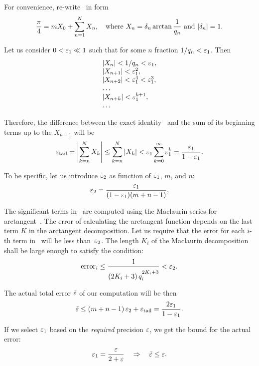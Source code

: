 \documentclass[draft, 10pt]{article} %
\begin{document}
For convenience, re-write~ in form
%
\begin{equation}\mlabel{machin-x}
\dfrac{\pi}{4} = m X_0 + \ds\sum_{n=1}^N X_n, \quad
    \hbox{where $X_n = \delta_n \arctan\dfrac{1}{q_n}$ and $\absolute{\delta_n} = 1$.}
\end{equation}

Let us consider $0 < \varepsilon_1 \ll 1$ such that for some $n$ fraction $1/q_n < \varepsilon_1$.
Then
$$
\begin{array}{l}
\left| X_n \right| < 1/q_n < \varepsilon_1, \\
\left| X_{n+1} \right| < \varepsilon_1^2, \\
\left| X_{n+2} \right| < \varepsilon_1^4 < \varepsilon_1^3, \\
\dots \\
\left| X_{n+k} \right| < \varepsilon_1^{k+1}, \\
\dots \\
\end{array}
$$

Therefore, the difference between the exact identity~ and the sum
of its beginning terms up to the $X_{n-1}$ will be
$$
\varepsilon_{\mathrm{tail}} = \left| \displaystyle\sum_{k=n}^N X_k \right| \le \displaystyle\sum_{k=n}^N \left| X_k \right|
    < \varepsilon_1 \displaystyle\sum_{k=0}^\infty \varepsilon_1^k = \displaystyle\frac{\varepsilon_1}{1-\varepsilon_1}.
$$

To be specific, let us introduce $\varepsilon_2$ as function of $\varepsilon_1$, $m$, and $n$:
$$
\varepsilon_2 = \displaystyle\frac{\varepsilon_1}{(1-\varepsilon_1)(m+n-1)},
$$

The significant terms in~ are computed using the Maclaurin series for
arctangent~. The error of calculating the arctangent function
depends on the last term $K$ in the arctangent decomposition.
Let us require that the error for each $i$-th term in~
will be less than~$\varepsilon_2$. The length $K_i$ of the Maclaurin decomposition
shall be large enough to satisfy the condition:
$$
\mathrm{error}_i \le \displaystyle\frac{1}{(2K_i+3) \, q_i^{2K_i+3\strut}} < \varepsilon_2.
$$

The actual total error $\tilde{\varepsilon}$ of our computation will be then
$$
\tilde{\varepsilon} \le (m+n-1) \, \varepsilon_2 + \varepsilon_{\mathrm{tail}} = \displaystyle\frac{2 \varepsilon_1}{1-\varepsilon_1}.
$$

If we select $\varepsilon_1$ based on the {\it required\/} precision $\varepsilon$, we get the bound for
the actual error:
%
\begin{equation}\mlabel{partial-precision}
\eps_1 = \dfrac{\eps}{2+\eps} \quad\ergo\quad \tilde\eps \le \eps.
\end{equation}
\end{document}
